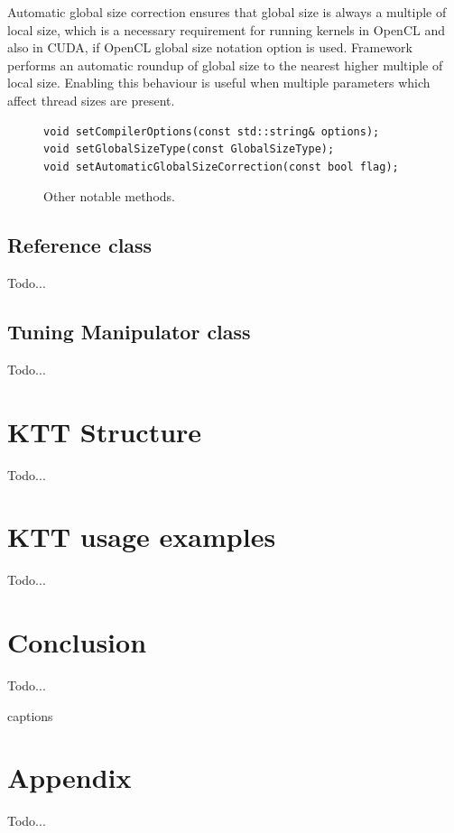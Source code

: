\documentclass
[
    digital, %
    oneside, %
    table, %
    nolof, %
    nolot, %
    nocover %
]{fithesis3}
\begin{document}
Automatic global size correction ensures that global size is always a multiple of local size, which is a necessary requirement for running kernels
in OpenCL and also in CUDA, if OpenCL global size notation option is used. Framework performs an automatic roundup of global size to the nearest higher
multiple of local size. Enabling this behaviour is useful when multiple parameters which affect thread sizes are present.

\begin{figure}
\begin{lstlisting}
void setCompilerOptions(const std::string& options);
void setGlobalSizeType(const GlobalSizeType);
void setAutomaticGlobalSizeCorrection(const bool flag);
\end{lstlisting}
\caption{Other notable methods.}
\label{ktt-utility-methods}
\end{figure}

\section{Reference class}
Todo...

\section{Tuning Manipulator class}
Todo...

\chapter{KTT Structure}
\label{ktt-structure}
Todo...

\chapter{KTT usage examples}
\label{ktt-usage}
Todo...

\chapter{Conclusion}
Todo...

\csname captions\languagename\endcsname
\makeatletter
\thesis@selectLocale{\thesis@locale}\makeatother
\printbibliography[heading=bibintoc]

\appendix
\chapter{Appendix}
Todo...
\end{document}
